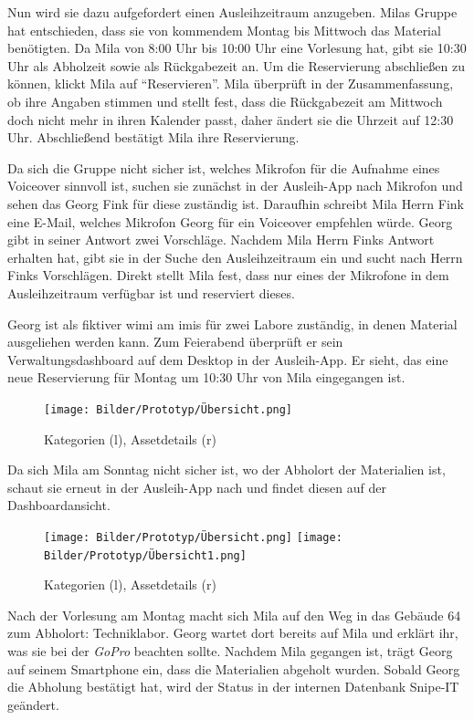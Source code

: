 Nun wird sie dazu aufgefordert einen Ausleihzeitraum anzugeben. Milas Gruppe hat entschieden, dass
sie von kommendem Montag bis Mittwoch das Material benötigten. Da Mila von 8:00 Uhr bis 10:00 Uhr
eine Vorlesung hat, gibt sie 10:30 Uhr als Abholzeit sowie als Rückgabezeit an. Um die Reservierung
abschließen zu können, klickt Mila auf \enquote{Reservieren}. Mila überprüft in der Zusammenfassung,
ob ihre Angaben stimmen und stellt fest, dass die Rückgabezeit am Mittwoch doch nicht mehr in ihren
Kalender passt, daher ändert sie die Uhrzeit auf 12:30 Uhr. Abschließend bestätigt Mila ihre
Reservierung.

Da sich die Gruppe nicht sicher ist, welches Mikrofon für die Aufnahme eines Voiceover sinnvoll ist,
suchen sie zunächst in der Ausleih-App nach Mikrofon und sehen das Georg Fink für diese zuständig ist.
Daraufhin schreibt Mila Herrn Fink eine E-Mail, welches Mikrofon Georg für ein Voiceover empfehlen würde.
Georg gibt in seiner Antwort zwei Vorschläge. Nachdem Mila Herrn Finks Antwort erhalten hat, gibt sie in
der Suche den Ausleihzeitraum ein und sucht nach Herrn Finks Vorschlägen. Direkt stellt Mila fest, dass nur
eines der Mikrofone in dem Ausleihzeitraum verfügbar ist und reserviert dieses.

Georg ist als fiktiver \ac{wimi} am \ac{imis} für zwei Labore zuständig, in denen Material
ausgeliehen werden kann. Zum Feierabend überprüft er sein Verwaltungsdashboard auf dem Desktop in
der Ausleih-App. Er sieht, das eine neue Reservierung für Montag um 10:30 Uhr von Mila eingegangen
ist.

\begin{figure}[h]
    \centering
    \texttt{[image: Bilder/Prototyp/Übersicht.png]}
    \label{fig:p4}
    \caption[Mockup: Kategorien, Assets, Assetdetails]{Kategorien (l), Assetdetails (r)}
\end{figure}

Da sich Mila am Sonntag nicht sicher ist, wo der Abholort der Materialien ist, schaut sie
erneut in der Ausleih-App nach und findet diesen auf der Dashboardansicht.

\begin{figure}[h]
    \centering
    \texttt{[image: Bilder/Prototyp/Übersicht.png]}\hspace{2em}
    \texttt{[image: Bilder/Prototyp/Übersicht1.png]}
    \label{fig:p4}
    \caption[Mockup: Kategorien, Assets, Assetdetails]{Kategorien (l), Assetdetails (r)}
\end{figure}

Nach der Vorlesung am Montag macht sich Mila auf den Weg in das Gebäude 64 zum Abholort: Techniklabor.
Georg wartet dort bereits auf Mila und erklärt ihr, was sie bei der \textit{GoPro} beachten sollte.
Nachdem Mila gegangen ist, trägt Georg auf seinem Smartphone ein, dass die Materialien abgeholt wurden.
Sobald Georg die Abholung bestätigt hat, wird der Status in der internen Datenbank Snipe-IT
geändert.

